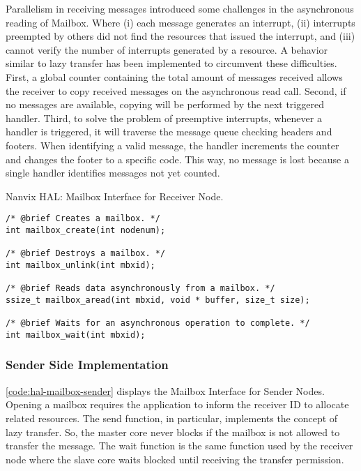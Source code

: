					Parallelism in receiving messages introduced some challenges in the
					asynchronous reading of Mailbox. Where (i) each message generates an
					interrupt, (ii) interrupts preempted by others did not find the \dnoc
					resources that issued the interrupt, and (iii) cannot verify the
					number of interrupts generated by a resource. A behavior similar to
					lazy transfer has been implemented to circumvent these difficulties.
					First, a global counter containing the total amount of messages
					received allows the receiver to copy received messages on the
					asynchronous read call. Second, if no messages are available, copying
					will be performed by the next triggered handler. Third, to solve the
					problem of preemptive interrupts, whenever a handler is triggered,
					it will traverse the message queue checking headers and footers.
					When identifying a valid message, the handler increments the counter
					and changes the footer to a specific code. This way, no message is
					lost because a single handler identifies messages not yet counted.

\begin{listing}[!tb]
\caption{Nanvix HAL: Mailbox Interface for Receiver Node.}
\label{code:hal-mailbox-receiver}
\begin{verbatim}
/* @brief Creates a mailbox. */
int mailbox_create(int nodenum);

/* @brief Destroys a mailbox. */
int mailbox_unlink(int mbxid);

/* @brief Reads data asynchronously from a mailbox. */
ssize_t mailbox_aread(int mbxid, void * buffer, size_t size);

/* @brief Waits for an asynchronous operation to complete. */
int mailbox_wait(int mbxid);
\end{verbatim}
\end{listing}

			\subsubsection{Sender Side Implementation}

				\autoref{code:hal-mailbox-sender} displays the Mailbox Interface for
				Sender Nodes. Opening a mailbox requires the application to inform
				the receiver ID to allocate related resources. The send function,
				in particular, implements the concept of lazy transfer. So, the master
				core never blocks if the mailbox is not allowed to transfer the message.
				The wait function is the same function used by the receiver node where
				the slave core waits blocked until receiving the transfer permission.

